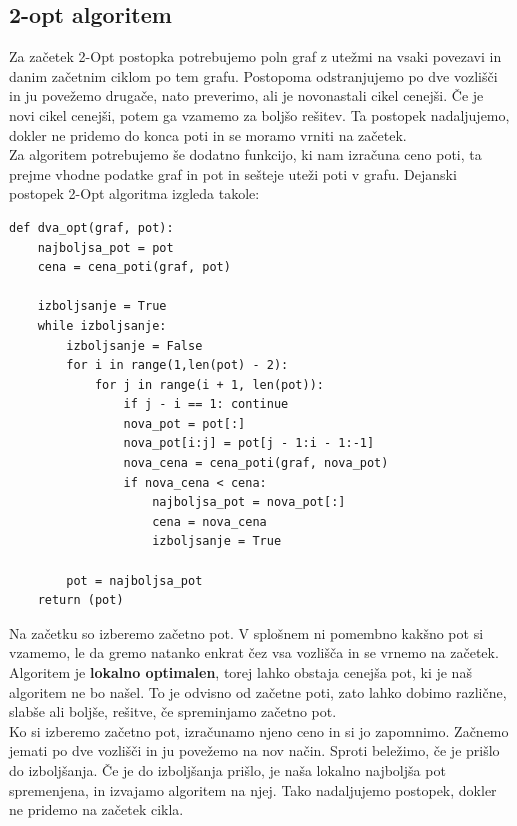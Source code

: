\documentclass[12pt, a4paper]{article}
\begin{document}
\subsection[2-opt algoritem]{2-opt algoritem}

Za začetek 2-Opt postopka potrebujemo poln graf z utežmi na vsaki povezavi in danim začetnim ciklom po tem grafu. Postopoma odstranjujemo po dve vozlišči in ju povežemo drugače, nato preverimo, ali je novonastali cikel cenejši. Če je novi cikel cenejši, potem ga vzamemo za boljšo rešitev. Ta postopek nadaljujemo, dokler ne pridemo do konca poti in se moramo vrniti na začetek. \\

Za algoritem potrebujemo še dodatno funkcijo, ki nam izračuna ceno poti, ta prejme vhodne podatke graf in pot in sešteje uteži poti v grafu. Dejanski postopek 2-Opt algoritma izgleda takole:
\begin{verbatim}
def dva_opt(graf, pot):
    najboljsa_pot = pot
    cena = cena_poti(graf, pot)
    
    izboljsanje = True
    while izboljsanje:
        izboljsanje = False
        for i in range(1,len(pot) - 2):
            for j in range(i + 1, len(pot)):
                if j - i == 1: continue
                nova_pot = pot[:]
                nova_pot[i:j] = pot[j - 1:i - 1:-1]
                nova_cena = cena_poti(graf, nova_pot)
                if nova_cena < cena:
                    najboljsa_pot = nova_pot[:]
                    cena = nova_cena
                    izboljsanje = True
                    
        pot = najboljsa_pot
    return (pot)

\end{verbatim}

Na začetku so izberemo začetno pot. V splošnem ni pomembno kakšno pot si vzamemo, le da gremo natanko enkrat čez vsa vozlišča in se vrnemo na začetek. Algoritem je \textbf{lokalno optimalen}, torej lahko obstaja cenejša pot, ki je naš algoritem ne bo našel. To je odvisno od začetne poti, zato lahko dobimo različne, slabše ali boljše, rešitve, če spreminjamo začetno pot.\\

Ko si izberemo začetno pot, izračunamo njeno ceno in si jo zapomnimo. Začnemo jemati po dve vozlišči in ju povežemo na nov način. Sproti beležimo, če je prišlo do izboljšanja. Če je do izboljšanja prišlo, je naša lokalno najboljša pot spremenjena, in izvajamo algoritem na njej. Tako nadaljujemo postopek, dokler ne pridemo na začetek cikla.\\
\end{document}
